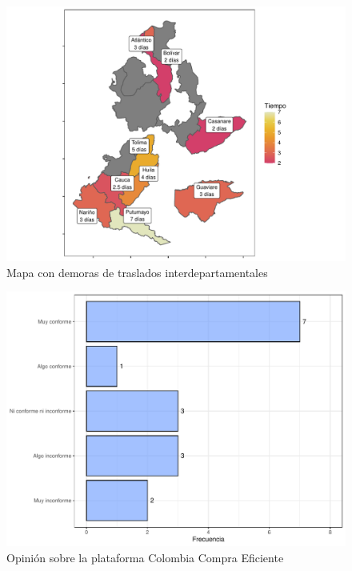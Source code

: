 \documentclass[
]{book}
\begin{document}
\begin{figure}
\includegraphics[width=0.9\linewidth]{InformeFinal_files/figure-latex/TiemposTransladosMapa-1} \caption{Mapa con demoras de traslados interdepartamentales}\label{fig:TiemposTransladosMapa}
\end{figure}

\begin{figure}
\includegraphics[width=0.85\linewidth]{InformeFinal_files/figure-latex/ColombiaCompra-1} \caption{Opinión sobre la plataforma Colombia Compra Eficiente}\label{fig:ColombiaCompra}
\end{figure}
\end{document}
